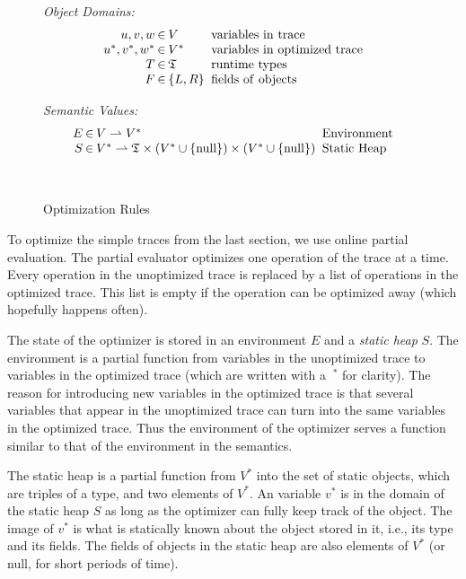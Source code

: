 \documentclass{sigplanconf}
\newcommand\ie{i.e.,\xspace}
\begin{document}
\begin{figure}
\begin{center}
\begin{minipage}[b]{7 cm}
\emph{Object Domains:}
$$\setlength\arraycolsep{0.1em}
 \begin{array}{rcll}
    u,v,w & \in & V & \mathrm{\ variables\ in\ trace}\\
    u^*,v^*,w^* & \in & V^* & \mathrm{\ variables\ in\ optimized\ trace}\\
    T & \in & \mathfrak{T} & \mathrm{\ runtime\ types}\\
    F & \in & \left\{ L,R\right\} & \mathrm{\ fields\ of\ objects}\\
 \end{array}
$$
\end{minipage}
\begin{minipage}[b]{5 cm}
\emph{Semantic Values:}
$$\setlength\arraycolsep{0.1em}
 \begin{array}{rcll}
    E & \in & V\rightharpoonup V^* & \mathrm{\ Environment}\\
    S & \in & V^*\rightharpoonup\mathfrak{T}\times(V^*\cup \{ \mathrm{null} \})\times (V^*\cup \{ \mathrm{null}\} ) & \mathrm{\ Static\ Heap}\\
    \\
    \\
 \end{array}
$$
\end{minipage}
\end{center}
\label{fig:optimization}
\caption{Optimization Rules}
\end{figure}

To optimize the simple traces from the last section, we use online partial
evaluation. The partial evaluator optimizes one operation of the trace at a
time. Every operation in the unoptimized trace is replaced by a list of
operations in the optimized trace. This list is empty if the operation
can be optimized away (which hopefully happens often).

The state of the optimizer is stored in an environment $E$ and a \emph{static
heap} $S$. The environment is a partial function from variables in the
unoptimized trace to variables in the optimized trace (which are written with a
$\ ^*$ for clarity). The reason for introducing new variables in the optimized
trace is that several variables that appear in the unoptimized trace can turn
into the same variables in the optimized trace. Thus the environment of the
optimizer serves a function similar to that of the environment in the semantics.

The static heap is a partial function from $V^*$ into the
set of static objects, which are triples of a type, and two elements of $V^*$.
An variable $v^*$ is in the domain of the static heap $S$ as long as the
optimizer can fully keep track of the object. The image of $v^*$ is what is
statically known about the object stored in it, \ie its type and its fields. The
fields of objects in the static heap are also elements of $V^*$ (or null, for
short periods of time).
\end{document}

